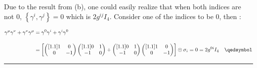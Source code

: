 \begin{solution}
\begin{enumerate}[label=(\alph*)]
    Due to the result from (b), one could easily realize that when both indices are not 0, $\left\{\gamma^i,\gamma^j\right\}=0$ which is $2g^{ij}I_4$.
    Consider one of the indices to be 0, then :

    \begin{align*}
        \gamma^\mu \gamma^\nu + \gamma^\nu \gamma^\mu &= \gamma^0 \gamma^i + \gamma^i \gamma^0 \\[0.15in]
                                                      &= \left[ 
                                                        \begin{pmatrix}[1.1]
                                                            1 & 0 \\
                                                            0 & -1 
                                                        \end{pmatrix}
                                                        \begin{pmatrix}[1.1]
                                                            0 & 1 \\
                                                            -1 & 0 
                                                        \end{pmatrix} + 
                                                        \begin{pmatrix}[1.1]
                                                            0 & 1 \\
                                                            -1 & 0 
                                                        \end{pmatrix}
                                                        \begin{pmatrix}[1.1]
                                                            1 & 0 \\
                                                            0 & -1 
                                                        \end{pmatrix}
                                                      \right] \otimes \sigma_i =0 = 2g^{0i} I_4 \qed
    \end{align*}
\end{enumerate}
\end{solution}

\noindent\rule{7in}{1.5pt}


